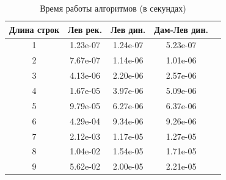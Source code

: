 \begin{table}[h]
	\begin{center}
		\begin{threeparttable}
		\captionsetup{justification=raggedright,singlelinecheck=off}
		\caption{Время работы алгоритмов (в секундах)}
		\label{tbl:time_measurements}
		\begin{tabular}{|c|c|c|c|c|}
			\hline
			Длина строк &  Лев рек. & Лев дин. & Дам-Лев дин. \\
			\hline
                                1 & 1.23e-07 & 1.24e-07 & 5.23e-07 \\
                        \hline
                                2 & 7.67e-07 & 1.14e-06 & 1.01e-06 \\
                         \hline
                                3 & 4.13e-06 & 2.20e-06 & 2.57e-06 \\
                         \hline
                                4 & 1.67e-05 & 3.97e-06 & 5.09e-06 \\
                         \hline
                                5 & 9.79e-05 & 6.27e-06 & 6.37e-06 \\
                         \hline
                                6 & 4.29e-04 & 9.34e-06 & 9.26e-06 \\
                         \hline
                                7 & 2.12e-03 & 1.17e-05 & 1.27e-05 \\
                         \hline
                                8 & 1.04e-02 & 1.54e-05 & 1.71e-05 \\
                         \hline
                                9 & 5.62e-02 & 2.00e-05 & 2.21e-05 \\
                         \hline
		\end{tabular}
		\end{threeparttable}
    \end{center}
\end{table}

\clearpage


